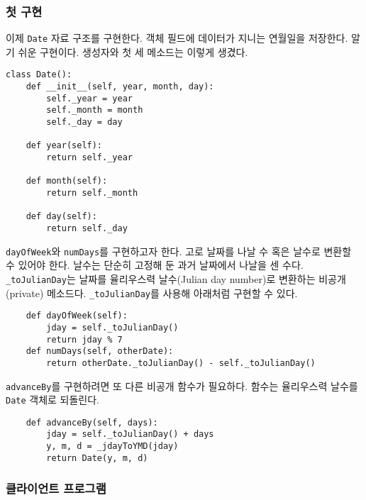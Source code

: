 \documentclass[a4paper]{oblivoir}
\begin{document}
\subsubsection*{첫 구현}

이제 \texttt{Date} 자료 구조를 구현한다. 객체 필드에 데이터가 지니는 연월일을 저장한다. 알기 쉬운 구현이다. 생성자와 첫 세 메소드는 이렇게 생겼다.

\begin{verbatim}
class Date():
    def __init__(self, year, month, day):
        self._year = year
        self._month = month
        self._day = day
        
    def year(self):
        return self._year
        
    def month(self):
        return self._month
        
    def day(self):
        return self._day
\end{verbatim}

\texttt{dayOfWeek}와 \texttt{numDays}를 구현하고자 한다. 고로 날짜를 나날 수 혹은 날수로 변환할 수 있어야 한다. 날수는 단순히 고정해 둔 과거 날짜에서 나날을 센 수다. \texttt{\_toJulianDay}는 날짜를 율리우스력 날수(Julian day number)로 변환하는 비공개(private) 메소드다. \texttt{\_toJulianDay}를 사용해 아래처럼 구현할 수 있다.

\begin{verbatim}
    def dayOfWeek(self):
        jday = self._toJulianDay()
        return jday % 7
    def numDays(self, otherDate):
        return otherDate._toJulianDay() - self._toJulianDay()
\end{verbatim}

\texttt{advanceBy}를 구현하려면 또 다른 비공개 함수가 필요하다. 함수는 율리우스력 날수를 \texttt{Date} 객체로 되돌린다. 

\begin{verbatim}
    def advanceBy(self, days):
        jday = self._toJulianDay() + days
        y, m, d = _jdayToYMD(jday)
        return Date(y, m, d)
\end{verbatim}

\subsubsection*{클라이언트 프로그램}
\end{document}
